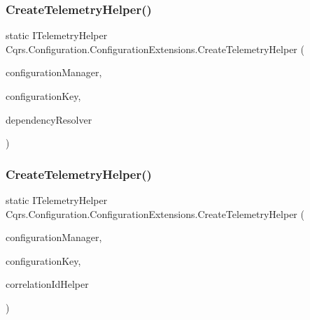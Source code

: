\subsubsection{\texorpdfstring{Create\+Telemetry\+Helper()}{CreateTelemetryHelper()}\hspace{0.1cm}{\footnotesize\ttfamily [1/2]}}
{\footnotesize\ttfamily static I\+Telemetry\+Helper Cqrs.\+Configuration.\+Configuration\+Extensions.\+Create\+Telemetry\+Helper (\begin{DoxyParamCaption}\item[{this \hyperlink{interfaceCqrs_1_1Configuration_1_1IConfigurationManager}{I\+Configuration\+Manager}}]{configuration\+Manager,  }\item[{string}]{configuration\+Key,  }\item[{\hyperlink{interfaceCqrs_1_1Configuration_1_1IDependencyResolver}{I\+Dependency\+Resolver}}]{dependency\+Resolver }\end{DoxyParamCaption})\hspace{0.3cm}{\ttfamily [static]}}

\mbox{\label{classCqrs_1_1Configuration_1_1ConfigurationExtensions_a5b4906550efcc42fd0904c23bd7ae685}} 
\subsubsection{\texorpdfstring{Create\+Telemetry\+Helper()}{CreateTelemetryHelper()}\hspace{0.1cm}{\footnotesize\ttfamily [2/2]}}
{\footnotesize\ttfamily static I\+Telemetry\+Helper Cqrs.\+Configuration.\+Configuration\+Extensions.\+Create\+Telemetry\+Helper (\begin{DoxyParamCaption}\item[{this \hyperlink{interfaceCqrs_1_1Configuration_1_1IConfigurationManager}{I\+Configuration\+Manager}}]{configuration\+Manager,  }\item[{string}]{configuration\+Key,  }\item[{I\+Correlation\+Id\+Helper}]{correlation\+Id\+Helper }\end{DoxyParamCaption})\hspace{0.3cm}{\ttfamily [static]}}

